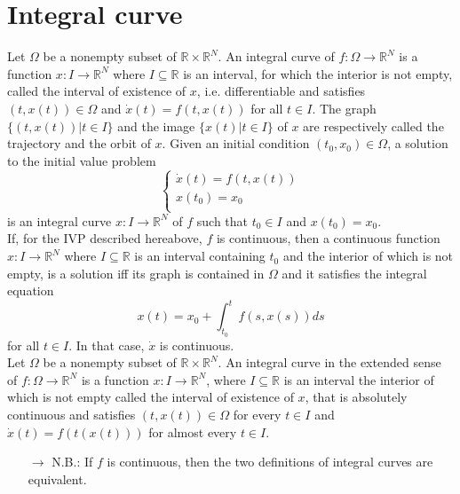 \documentclass[12pt, openany]{report}
\theoremstyle{definition}
\newcommand{\R}{\mathbb{R}}
\begin{document}
\section{Integral curve}
Let \(\Omega\) be a nonempty subset of \(\R\times \R^N\). An integral curve of \(f:\Omega\rightarrow \R^N\) is a function \(x:I\rightarrow \R^N\) where \(I\subseteq \R\) is an interval, for which the interior is not empty, called the interval of existence of \(x\), i.e. differentiable and satisfies \((t,x(t))\in \Omega\) and \(\dot x(t) = f(t,x(t))\) for all \(t\in I\). The graph \(\{(t,x(t))|t\in I\}\) and the image \(\{x(t)|t\in I\}\) of \(x\) are respectively called the trajectory and the orbit of \(x\). Given an initial condition \((t_0,x_0)\in \Omega\), a solution to the initial value problem 
\begin{equation}
    \begin{cases}
        \dot x(t) = f(t,x(t))\\
        x(t_0) = x_0\\
    \end{cases}
\end{equation}
is an integral curve \(x:I\rightarrow \R^N\) of \(f\) such that \(t_0\in I\) and \(x(t_0)=x_0\). \\

If, for the IVP described hereabove, \(f\) is continuous, then a continuous function \(x:I\rightarrow \R^N\) where \(I\subseteq \R\) is an interval containing \(t_0\) and the interior of which is not empty, is a solution iff its graph is contained in \(\Omega\) and it satisfies the integral equation \[x(t)=x_0+\int_{t_0}^tf(s,x(s))ds\] for all \(t\in I\). In that case, \(\dot x\) is continuous. \\

Let \(\Omega\) be a nonempty subset of \(\R\times \R^N\). An integral curve in the extended sense of \(f:\Omega\rightarrow \R^N\) is a function \(x:I\rightarrow \R^N\), where \(I\subseteq \R\) is an interval the interior of which is not empty called the interval of existence of \(x\), that is absolutely continuous and satisfies \((t,x(t))\in \Omega\) for every \(t\in I\) and \(\dot x(t) = f(t(x(t)))\) for almost every \(t\in I\). 
\begin{itemize}
    \item [\(\rightarrow\)] N.B.: If \(f\) is continuous, then the two definitions of integral curves are equivalent.
\end{itemize}
\end{document}
